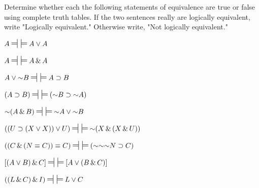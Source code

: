 \noindent\problempart
Determine whether each the following statements of equivalence are true or false using complete truth tables. If the two sentences really are logically equivalent, write "Logically equivalent." Otherwise write, "Not logically equivalent." 
\begin{exercises}
\item $A\ndststile{}{} \hspace{.5em} \sdtstile{}{}A \eor A$\vspace{.5ex} 												%
\item $A\ndststile{}{} \hspace{.5em} \sdtstile{}{}A \eand A$\vspace{.5ex} 												%
\item $A \eor \enot B\ndststile{}{} \hspace{.5em} \sdtstile{}{}A\eif B$\vspace{.5ex} 									%
\item $(A \eif B)\ndststile{}{} \hspace{.5em} \sdtstile{}{}(\enot B \eif \enot A)$\vspace{.5ex} 							%
\item $\enot(A \eand B)\ndststile{}{} \hspace{.5em} \sdtstile{}{}\enot A \eor \enot B$ \vspace{.5ex}						%
\item $ ((U \eif (X \eor X)) \eor U) \ndststile{}{} \hspace{.5em} \sdtstile{}{} \enot (X \eand (X \eand U)) $\vspace{.5ex}	%
\item $ ((C \eand (N \eiff C)) \eiff C) \ndststile{}{} \hspace{.5em} \sdtstile{}{} (\enot \enot \enot N \eif C) $\vspace{.5ex}	%
\item $[(A \eor B) \eand C]\ndststile{}{} \hspace{.5em} \sdtstile{}{}[A \eor (B \eand C)]$\vspace{.5ex} 					%
\item $((L \eand C) \eand I)\ndststile{}{} \hspace{.5em} \sdtstile{}{}L \eor C$\vspace{.5ex}								%
\end{exercises}


